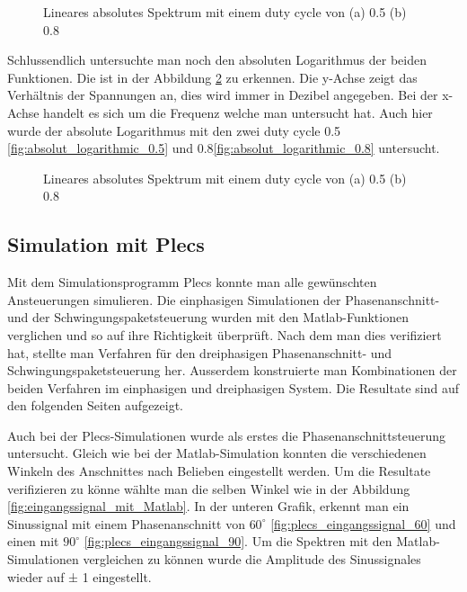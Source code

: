 \begin{figure}[h]
	\centering
	\qquad
	\caption{Lineares absolutes Spektrum mit einem duty cycle von (a) 0.5 (b) 0.8}
	\label{fig:Schwingungspaketspektrum Matlab}
\end{figure}

Schlussendlich untersuchte man noch den absoluten Logarithmus der beiden Funktionen. Die ist in der Abbildung \ref{fig:absolut_logaritmic_matlab} zu erkennen. Die y-Achse zeigt das Verhältnis der Spannungen an, dies wird immer in Dezibel angegeben. Bei der x-Achse handelt es sich um die Frequenz welche man untersucht hat. Auch hier wurde der absolute Logarithmus mit den zwei duty cycle 0.5 \ref{fig:absolut_logarithmic_0.5} und 0.8\ref{fig:absolut_logarithmic_0.8} untersucht.


\begin{figure}[h]
	\centering
	\qquad
	\caption{Lineares absolutes Spektrum mit einem duty cycle von (a) 0.5 (b) 0.8}
	\label{fig:absolut_logaritmic_matlab}
\end{figure}
\newpage
\subsection{Simulation mit Plecs}

Mit dem Simulationsprogramm Plecs konnte man alle gewünschten Ansteuerungen simulieren. Die einphasigen Simulationen der Phasenanschnitt- und der Schwingungspaketsteuerung wurden mit den Matlab-Funktionen verglichen und so auf ihre Richtigkeit überprüft. Nach dem man dies verifiziert hat, stellte man Verfahren für den dreiphasigen Phasenanschnitt- und Schwingungspaketsteuerung her. Ausserdem konstruierte man Kombinationen der beiden Verfahren im einphasigen und dreiphasigen System. Die Resultate sind auf den folgenden Seiten aufgezeigt.

\newpage

Auch bei der Plecs-Simulationen wurde als erstes die Phasenanschnittsteuerung untersucht. Gleich wie bei der Matlab-Simulation konnten die verschiedenen Winkeln des Anschnittes nach Belieben eingestellt werden. Um die Resultate verifizieren zu könne wählte man die selben Winkel wie in der Abbildung \ref{fig:eingangssignal_mit_Matlab}. In der unteren Grafik, erkennt man ein Sinussignal mit einem Phasenanschnitt von $60^\circ$ \ref{fig:plecs_eingangssignal_60} und einen mit $90^\circ$ \ref{fig:plecs_eingangssignal_90}. Um die Spektren mit den Matlab-Simulationen vergleichen zu können wurde die Amplitude des Sinussignales wieder auf ± 1 eingestellt. 

